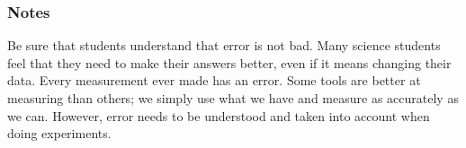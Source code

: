 \subsubsection*{Notes}
Be sure that students understand that error is not bad. Many science students feel that they need to make their answers better, even if it means changing their data. Every measurement ever made has an error. Some tools are better at measuring than others; we simply use what we have and measure as accurately as we can. However, error needs to be understood and taken into account when doing experiments.
